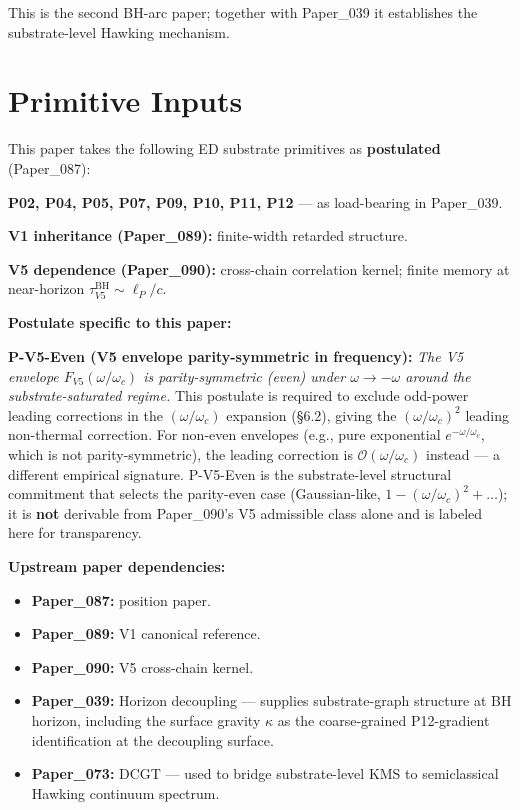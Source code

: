 \documentclass[11pt,a4paper]{article}
\begin{document}
This is the second BH-arc paper; together with Paper\_039 it establishes the substrate-level Hawking mechanism.

\section{Primitive Inputs}

This paper takes the following ED substrate primitives as \textbf{postulated} (Paper\_087):

\textbf{P02, P04, P05, P07, P09, P10, P11, P12} --- as load-bearing in Paper\_039.

\textbf{V1 inheritance (Paper\_089):} finite-width retarded structure.

\textbf{V5 dependence (Paper\_090):} cross-chain correlation kernel; finite memory at near-horizon $\tau_{V5}^\mathrm{BH} \sim \ell_P/c$.

\textbf{Postulate specific to this paper:}

\textbf{P-V5-Even (V5 envelope parity-symmetric in frequency):} \emph{The V5 envelope $F_{V5}(\omega/\omega_c)$ is parity-symmetric (even) under $\omega \to -\omega$ around the substrate-saturated regime.} This postulate is required to exclude odd-power leading corrections in the $(\omega/\omega_c)$ expansion (\S6.2), giving the $(\omega/\omega_c)^2$ leading non-thermal correction. For non-even envelopes (e.g., pure exponential $e^{-\omega/\omega_c}$, which is not parity-symmetric), the leading correction is $\mathcal{O}(\omega/\omega_c)$ instead --- a different empirical signature. P-V5-Even is the substrate-level structural commitment that selects the parity-even case (Gaussian-like, $1 - (\omega/\omega_c)^2 + \ldots$); it is \textbf{not} derivable from Paper\_090's V5 admissible class alone and is labeled here for transparency.

\textbf{Upstream paper dependencies:}

\begin{itemize}[noitemsep]
\item \textbf{Paper\_087:} position paper.
\item \textbf{Paper\_089:} V1 canonical reference.
\item \textbf{Paper\_090:} V5 cross-chain kernel.
\item \textbf{Paper\_039:} Horizon decoupling --- supplies substrate-graph structure at BH horizon, including the surface gravity $\kappa$ as the coarse-grained P12-gradient identification at the decoupling surface.
\item \textbf{Paper\_073:} DCGT --- used to bridge substrate-level KMS to semiclassical Hawking continuum spectrum.
\end{itemize}
\end{document}
